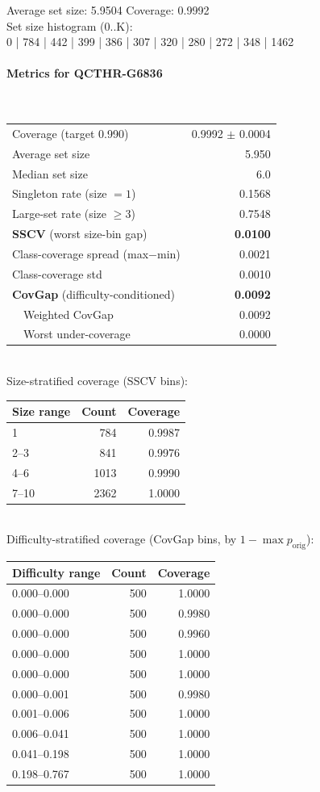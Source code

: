 \documentclass[parskip=half]{scrartcl}
\begin{document}
Average set size: 5.9504   Coverage: 0.9992\\
Set size histogram (0..K):\\
0 | 784 | 442 | 399 | 386 | 307 | 320 | 280 | 272 | 348 | 1462\\
\paragraph{Metrics for QCTHR-G6836}~\\
\begin{tabular}{l r}
\hline
Coverage (target 0.990) & 0.9992 $\pm$ 0.0004 \\
Average set size & 5.950 \\
Median set size & 6.0 \\
Singleton rate (size $=1$) & 0.1568 \\
Large-set rate (size $\geq 3$) & 0.7548 \\
\textbf{SSCV} (worst size-bin gap) & \textbf{0.0100} \\
Class-coverage spread (max$-$min) & 0.0021 \\
Class-coverage std & 0.0010 \\
\textbf{CovGap} (difficulty-conditioned) & \textbf{0.0092} \\
~~Weighted CovGap & 0.0092 \\
~~Worst under-coverage & 0.0000 \\
\hline
\end{tabular}\\[0.5em]
\textsf{\scriptsize Size-stratified coverage (SSCV bins):}\\
\begin{tabular}{l r r}
\hline
Size range & Count & Coverage \\
\hline
1 & 784 & 0.9987 \\
2--3 & 841 & 0.9976 \\
4--6 & 1013 & 0.9990 \\
7--10 & 2362 & 1.0000 \\
\hline
\end{tabular}\\[0.5em]
\textsf{\scriptsize Difficulty-stratified coverage (CovGap bins, by $1-\max p_{\mathrm{orig}}$):}\\
\begin{tabular}{l r r}
\hline
Difficulty range & Count & Coverage \\
\hline
0.000--0.000 & 500 & 1.0000 \\
0.000--0.000 & 500 & 0.9980 \\
0.000--0.000 & 500 & 0.9960 \\
0.000--0.000 & 500 & 1.0000 \\
0.000--0.000 & 500 & 1.0000 \\
0.000--0.001 & 500 & 0.9980 \\
0.001--0.006 & 500 & 1.0000 \\
0.006--0.041 & 500 & 1.0000 \\
0.041--0.198 & 500 & 1.0000 \\
0.198--0.767 & 500 & 1.0000 \\
\hline
\end{tabular}\\[0.5em]
\end{document}
